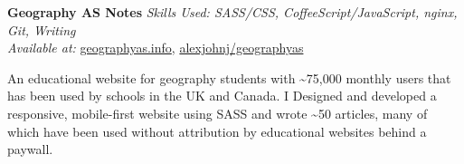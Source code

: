 \textbf{Geography AS Notes}  \newline
\textit{Skills Used: SASS/CSS, CoffeeScript/JavaScript, nginx, Git, Writing}\\
\textit{Available at:} \href{https://geographyas.info}{geographyas.info}, \href{https://github.com/\myweb/geographyas}{alexjohnj/geographyas}

An educational website for geography students with \textasciitilde{}75,000
monthly users that has been used by schools in the UK and Canada. I Designed and
developed a responsive, mobile-first website using SASS and wrote
\textasciitilde{}50 articles, many of which have been used without attribution
by educational websites behind a paywall.

